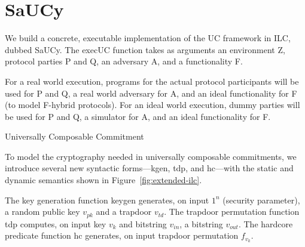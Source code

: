\section{SaUCy}
\label{sec:saucy}

We build a concrete, executable implementation of the UC framework in ILC,
dubbed SaUCy. The \textsf{execUC} function takes as arguments an environment
\textsf{Z}, protocol parties \textsf{P} and \textsf{Q}, an adversary \textsf{A},
and a functionality \textsf{F}.

For a real world execution, programs for the actual protocol participants will be
used for \textsf{P} and \textsf{Q}, a real world adversary for \textsf{A}, and
an ideal functionality for \textsf{F} (to model \textsf{F}-hybrid
protocols). For an ideal world execution, dummy parties will be used for
\textsf{P} and \textsf{Q}, a simulator for \textsf{A}, and an ideal
functionality for \textsf{F}.

\begin{algorithm}
\DontPrintSemicolon

\smallskip
{}
\smallskip

\caption{Universally Composable Commitment}
\label{alg:com}
\end{algorithm}

To model the cryptography needed in universally composable commitments, we
introduce several new syntactic forms---\textsf{kgen}, \textsf{tdp}, and
\textsf{hc}---with the static and dynamic semantics shown in
Figure~\ref{fig:extended-ilc}.

The key generation function \textsf{keygen} generates, on input $1^n$ (security
parameter), a random public key $v_{pk}$ and a trapdoor $v_{td}$. The trapdoor
permutation function \textsf{tdp} computes, on input key $v_k$ and bitstring
$v_{in}$, a bitstring $v_{out}$. The hardcore predicate function \textsf{hc}
generates, on input trapdoor permutation $f_{v_k}$.


